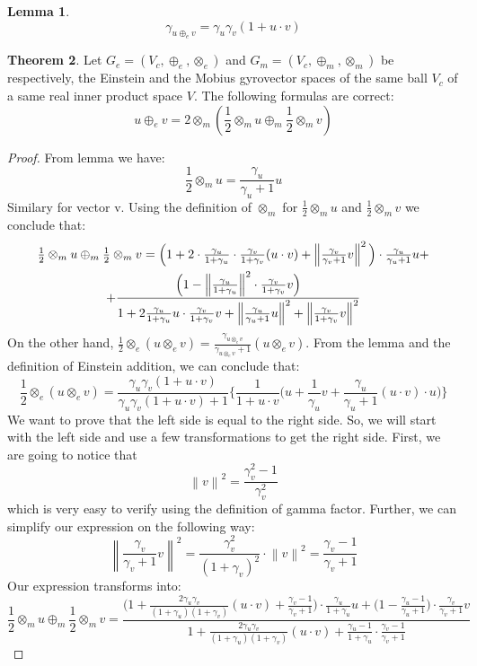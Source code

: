 \documentclass[a4paper]{article}
\theoremstyle{definition}
\newtheorem{theorem}{Theorem}[section]
\newtheorem{lemma}[theorem]{Lemma}
\newcommand{\norm}[1]{\left\lVert#1\right\rVert}
\begin{document}
\begin{lemma}$$\gamma_{u\oplus_e v} = \gamma_u\gamma_v(1+u\cdot v)$$
\end{lemma}
\begin{theorem}Let $G_e=(V_c, \oplus_e, \otimes_e)$ and $G_m=(V_c, \oplus_m, \otimes_m)$ be respectively, the Einstein and the Mobius gyrovector spaces of the same ball $V_c$ of a same real inner product space $V$.
The following formulas are correct:
$$u\oplus_e v = 2\otimes_m (\frac{1}{2}\otimes_m u \oplus_m \frac{1}{2} \otimes_m v)$$
\end{theorem}
\begin{proof}From lemma we have:
$$\frac{1}{2}\otimes_m u = \frac{\gamma_u}{\gamma_u + 1} u$$
Similary for vector v. Using the definition of $\otimes_m$ for $\frac{1}{2}\otimes_m u$ and $\frac{1}{2}\otimes_m v$ we conclude that:
\begin{multline}
$$\frac{1}{2}\otimes_m u \oplus_m \frac{1}{2} \otimes_m v = \Big(1 + 2\cdot\frac{\gamma_u}{1+\gamma_u}\cdot\frac{\gamma_v}{1+\gamma_v}(u\cdot v) + \norm{\frac{\gamma_v}{\gamma_v+1}v}^2\Big) \cdot \frac{\gamma_u}{\gamma_u + 1}u + \\ + \frac{\Big(1-\norm{\frac{\gamma_u}{1+\gamma_u}}^2\cdot \frac{\gamma_v}{1+\gamma_v}v\Big)}{1+2\frac{\gamma_u}{1+\gamma_u}u \cdot \frac{\gamma_v}{1+\gamma_v}v + \norm{\frac{\gamma_u}{\gamma_u+1}u}^2 + \norm{\frac{\gamma_v}{1+\gamma_v}v}^2} $$
\end{multline}
On the other hand, $\frac{1}{2}\otimes_e (u \otimes_e v) = \frac{\gamma_{u \otimes_e v}}{\gamma_{u \otimes_e v} + 1}(u \otimes_e v)$. From the lemma and the definition of Einstein addition, we can conclude that:
$$\frac{1}{2}\otimes_e (u \otimes_e v) = \frac{\gamma_u \gamma_v (1+u\cdot v)}{\gamma_u \gamma_v (1+u\cdot v) + 1}\Big\{\frac{1}{1+u\cdot v}\Big( u +\frac{1}{\gamma_u}v + \frac{\gamma_u}{\gamma_u + 1}(u\cdot v)\cdot u \Big)\Big\}$$
We want to prove that the left side is equal to the right side. So, we will start with the left side and use a few transformations to get the right side.
First, we are going to notice that $$\norm{v}^2 = \frac{\gamma_v^2-1}{\gamma_v^2}$$ which is very easy to verify using the definition of gamma factor. Further, we can simplify our expression on the following way:
$$\norm{\frac{\gamma_v}{\gamma_v+1}v}^2 =\frac{\gamma_v^2}{(1+\gamma_v)^2}\cdot\norm{v}^2 = \frac{\gamma_v-1}{\gamma_v+1}$$
Our expression transforms into:
$$\frac{1}{2}\otimes_m u \oplus_m \frac{1}{2} \otimes_m v = \frac{\Big(1+\frac{2\gamma_u\gamma_v}{(1+\gamma_u)(1+\gamma_v)}(u\cdot v) + \frac{\gamma_v -1}{\gamma_v+1}\Big)\cdot \frac{\gamma_u}{1+\gamma_u}u + \Big(1-\frac{\gamma_u-1}{\gamma_u+1}\Big)\cdot \frac{\gamma_v}{\gamma_v+1}v}{1 + \frac{2\gamma_u\gamma_v}{(1+\gamma_u)(1+\gamma_v)}(u\cdot v)+\frac{\gamma_u-1}{1+\gamma_u}\cdot\frac{\gamma_v-1}{\gamma_v+1}}$$


\end{proof}
\end{document}
